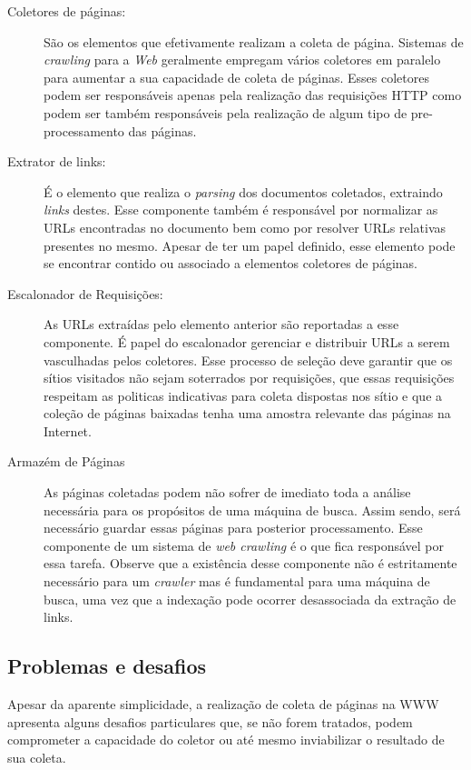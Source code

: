 \documentclass[10pt,twocolumn]{article}
\begin{document}
\begin{description}

\item[Coletores de páginas:] São os elementos que efetivamente realizam
a coleta de página. Sistemas de \emph{crawling} para a \emph{Web}
geralmente empregam vários coletores em paralelo para aumentar a sua
capacidade de coleta de páginas. Esses coletores podem ser responsáveis
apenas pela realização das requisições HTTP como podem ser também
responsáveis pela realização de algum tipo de pre-processamento das
páginas.

\item[Extrator de links:] É o elemento que realiza o \emph{parsing} dos
documentos coletados, extraindo \emph{links} destes. Esse componente
também é responsável por normalizar as URLs encontradas no documento bem
como por resolver URLs relativas presentes no mesmo. Apesar de ter um
papel definido, esse elemento pode se encontrar contido ou associado a
elementos coletores de páginas.

\item[Escalonador de Requisições:] As URLs extraídas pelo elemento
anterior são reportadas a esse componente. É papel do
escalonador gerenciar e distribuir URLs a serem vasculhadas pelos
coletores. Esse processo de seleção deve garantir que os sítios
visitados não sejam soterrados por requisições, que essas requisições
respeitam as politicas indicativas para coleta dispostas nos sítio e que
a coleção de páginas baixadas tenha uma amostra relevante das páginas na
Internet.

\item[Armazém de Páginas] As páginas coletadas podem não sofrer 
de imediato toda a
análise necessária para os propósitos de uma máquina de busca. Assim
sendo, será necessário guardar essas páginas para posterior
processamento. Esse componente de um sistema de \emph{web crawling} é o
que fica responsável por essa tarefa. Observe que a existência desse
componente não é estritamente necessário para um \emph{crawler} mas é
fundamental para uma máquina de busca, uma vez que a indexação pode
ocorrer desassociada da extração de links.
\end{description}

\subsection{Problemas e desafios}

Apesar da aparente simplicidade, a realização de coleta de páginas na
WWW apresenta alguns desafios particulares que, se não forem tratados,
podem comprometer a capacidade do coletor ou até mesmo inviabilizar o
resultado de sua coleta. 
\end{document}
